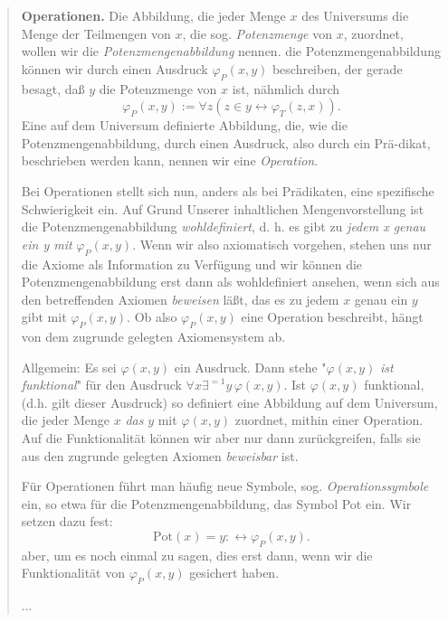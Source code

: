 \documentclass[11pt, a4paper]{article}
\begin{document}
\begin{quote}
    \textbf{Operationen.} Die Abbildung, die jeder Menge $x$ des Universums
    die Menge der Teilmengen von $x$, die sog. \textit{Potenzmenge} von $x$,
    zuordnet, wollen wir die \textit{Potenzmengenabbildung} nennen. die
    Potenzmengenabbildung können wir durch einen Ausdruck $\varphi_P(x,y)$
    beschreiben, der gerade besagt, daß $y$ die Potenzmenge von $x$ ist,
    nähmlich durch
    \[
        \varphi_P(x,y) := \forall z(z\in y\leftrightarrow\varphi_T(z, x)).
    \]
    Eine auf dem Universum definierte Abbildung, die, wie die
    Potenzmengenabbildung, durch einen Ausdruck, also durch ein Prä-dikat,
    beschrieben werden kann, nennen wir eine \textit{Operation}.

    Bei Operationen stellt sich nun, anders als bei Prädikaten, eine
    spezifische Schwierigkeit ein. Auf Grund Unserer inhaltlichen
    Mengenvorstellung ist die Potenzmengenabbildung \textit{wohldefiniert}, d.
    h. es gibt zu \textit{jedem x genau ein y mit} $\varphi_P(x,y)$. Wenn wir
    also axiomatisch vorgehen, stehen uns nur die Axiome als Information zu
    Verfügung und wir können die Potenzmengenabbildung erst dann als
    wohldefiniert ansehen, wenn sich aus den betreffenden Axiomen
    \textit{beweisen} läßt, das es zu jedem $x$ genau ein $y$ gibt mit
    $\varphi_P(x,y)$. Ob also $\varphi_P(x,y)$ eine Operation beschreibt,
    hängt von dem zugrunde gelegten Axiomensystem ab.

    Allgemein: Es sei $\varphi(x,y)$ ein Ausdruck. Dann stehe "$\varphi(x,y)$
    \textit{ist funktional}" für den Ausdruck $\forall x\exists^{=1}y\,
    \varphi(x,y)$. Ist $\varphi(x,y)$ funktional, (d.h. gilt dieser Ausdruck)
    so definiert eine Abbildung auf dem Universum, die jeder Menge $x$
    \textit{das} $y$ mit $\varphi(x,y)$ zuordnet, mithin einer Operation. Auf
    die Funktionalität können wir aber nur dann zurückgreifen, falls sie aus den
    zugrunde gelegten Axiomen \textit{beweisbar} ist.

    Für Operationen führt man häufig neue Symbole, sog.
    \textit{Operationssymbole} ein, so etwa für die Potenzmengenabbildung, das
    Symbol Pot ein. Wir setzen dazu fest:
    \[
        \textrm{Pot}(x) = y :\leftrightarrow\varphi_P(x,y).
    \]
    aber, um es noch einmal zu sagen, dies erst dann, wenn wir die
    Funktionalität von $\varphi_P(x,y)$ gesichert haben.
    
    ...


\end{quote}
\end{document}
